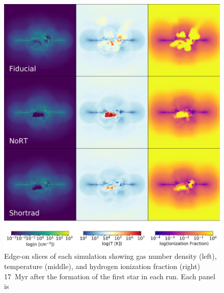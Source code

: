 \documentclass[twocolumn]{aastex62}
\begin{document}
\begin{figure}
\centering
\includegraphics[width=0.99\linewidth]{DD0136_fiducial_shortrad_nort}
\caption{Edge-on slices of each simulation showing gas number density (left), temperature (middle), and hydrogen ionization fraction (right) 17~Myr after the formation of the first star in each run. Each panel is }
\label{fig:panel1}
\end{figure}
\end{document}
